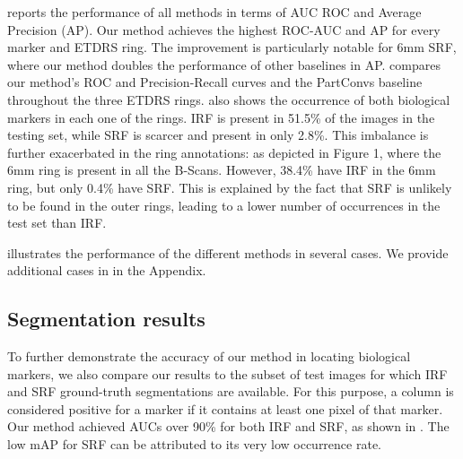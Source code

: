  reports the performance of all methods in terms of AUC ROC and Average Precision (AP). Our method achieves the highest ROC-AUC and AP for every marker and ETDRS ring. The improvement is particularly notable for 6mm SRF, where our method doubles the performance of other baselines in AP.  compares our method's ROC and Precision-Recall curves and the PartConvs baseline throughout the three ETDRS rings.  also shows the occurrence of both biological markers in each one of the rings. IRF is present in 51.5\% of the images in the testing set, while SRF is scarcer and present in only 2.8\%. This imbalance is further exacerbated in the ring annotations: as depicted in Figure 1, where the 6mm ring is present in all the B-Scans. However, 38.4\% have IRF in the 6mm ring, but only 0.4\% have SRF. This is explained by the fact that SRF is unlikely to be found in the outer rings, leading to a lower number of occurrences in the test set than IRF. 

\noindent



 illustrates the performance of the different methods in several cases. We provide additional cases in  in the Appendix.



\subsection{Segmentation results}

To further demonstrate the accuracy of our method in locating biological markers, we also compare our results to the subset of test images for which IRF and SRF ground-truth segmentations are available. For this purpose, a column is considered positive for a marker if it contains at least one pixel of that marker. Our method achieved AUCs over 90\% for both IRF and SRF, as shown in . The low mAP for SRF can be attributed to its very low occurrence rate.

